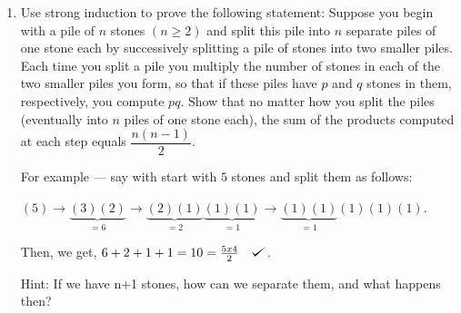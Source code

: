 \documentclass[12pt]{article}
\def\checkmark{\tikz\fill[scale=0.4](0,.35) -- (.25,0) -- (1,.7) -- (.25,.15) -- cycle;}
\begin{document}
\begin{enumerate}[resume]
\item Use strong induction to prove the following statement:
Suppose you begin with a pile of $n$ stones $(n \geq 2)$ and split this pile into $n$ separate
piles of one stone each by successively splitting a pile of stones into two smaller piles.
Each time you split a pile you multiply the number of stones in each of the two smaller
piles you form, so that if these piles have $p$ and $q$ stones in them, respectively, you
compute $pq$. Show that no matter how you split the piles (eventually into $n$ piles of
one stone each), the sum of the products computed at each step equals
$\dfrac{n(n - 1)}{2}$.

For example --- say with start with $5$ stones and split them as follows:

$(5)\rightarrow \underbrace{(3)(2)}_{=6}\rightarrow \underbrace{(2)(1)}_{=2}\underbrace{(1)(1)}_{=1}\rightarrow \underbrace{(1)(1)}_{=1}(1)(1)(1)$.

Then, we get, $6+2+1+1=10=\frac{5x4}{2}\quad\checkmark$.

Hint: If we have n+1 stones, how can we separate them, and what happens then?

%
%
%
%
%
%
%
%


\end{enumerate}
\end{document}
